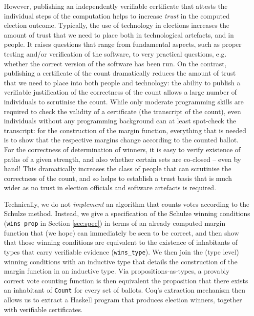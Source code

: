 However, publishing an independently verifiable certificate that
attests the individual steps of the computation helps to increase
\emph{trust} in the computed election outcome. Typically, the use of technology in
elections increases the amount of trust that we need to place both
in technological artefacts, and in people. It raises questions that
range from fundamental aspects, such as proper testing and/or
verification of the software, to very practical questions, e.g.
whether the correct version of the software has been run.  On the
contrast, publishing a certificate of the count dramatically reduces
the amount of trust that we need to place into both people and
technology: the ability to publish a verifiable justification of the
correctness of the count allows a large number of individuals to
scrutinise the count. While only moderate programming skills are
required to check the validity of a certificate (the transcript of
the count), even individuals without any programming background can
at least spot-check the transcript: for the construction of the
margin function, everything that is needed is to show that the
respective margins change according to the counted ballot. For the
correctness of determination of winners, it is easy to verify
existence of paths of a given strength, and also whether certain
sets are co-closed -- even by hand! This dramatically increases the
class of people that can scrutinise the correctness of the count,
and so helps to establish a trust basis that is much wider as no
trust in election officials and software artefacts is required.

Technically, we do not \emph{implement} an algorithm that counts
votes according to the Schulze method. Instead, we give a
specification of the Schulze winning conditions 
(\texttt{wins\_prop} in  Section \ref{sec:spec}) in terms of an
already computed margin function that
(we hope) can immediately be seen to be correct, and then show that those
winning conditions are equivalent to the existence of inhabitants of
types that carry verifiable evidence (\texttt{wins\_type}).  We then
join the (type level) winning conditions with an inductive type that
details the construction of the margin function in an inductive
type. Via propositions-as-types, a provably correct vote counting
function is then equivalent the proposition that there exists an
inhabitant of \texttt{Count} for every set of ballots.  Coq's
extraction mechanism then allows us to extract a Haskell program
that produces election winners, together with verifiable
certificates. 

